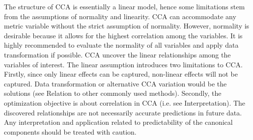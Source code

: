 The structure of CCA is essentially a linear model, hence some limitations stem from the assumptions of normality and linearity. CCA can accommodate any metric variable without the strict assumption of normality. However, normality is desirable because it allows for the highest correlation among the variables. It is highly recommended to evaluate the normality of all variables and apply data transformation if possible. CCA uncover the linear relationships among the variables of interest. The linear assumption introduces two limitations to CCA. Firstly, since only linear effects can be captured, non-linear effects will not be captured. Data transformation or alternative CCA variation would be the solutions (see Relation to other commonly used methods). Secondly, the optimization objective is about correlation in CCA (i.e. see Interpretation). The discovered relationships are not necessarily accurate predictions in future data. Any interpretation and application related to predictability of the canonical components should be treated with caution. 

